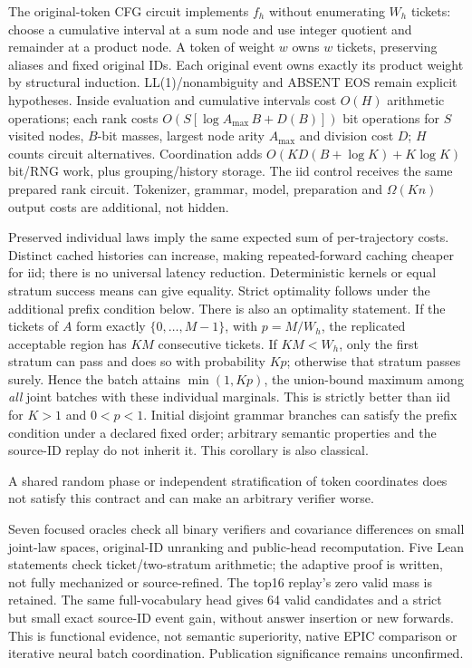\documentclass[12pt]{article}
\theoremstyle{readable}
\begin{document}
The original-token CFG circuit implements $f_h$ without enumerating $W_h$
tickets: choose a cumulative interval at a sum node and use integer quotient
and remainder at a product node. A token of weight $w$ owns $w$ tickets,
preserving aliases and fixed original IDs. Each original event owns exactly
its product weight by structural induction. LL(1)/nonambiguity and ABSENT EOS
remain explicit hypotheses. Inside evaluation and cumulative intervals cost
$O(H)$ arithmetic operations; each rank costs
$O(S[\log A_{\max}\,B+D(B)])$ bit operations for $S$ visited nodes,
$B$-bit masses, largest node arity $A_{\max}$ and division cost $D$;
$H$ counts circuit alternatives. Coordination adds
$O(KD(B+\log K)+K\log K)$ bit/RNG work, plus grouping/history storage.
The iid control receives the same prepared rank circuit. Tokenizer, grammar,
model, preparation and $\Omega(Kn)$ output costs are additional, not hidden.

Preserved individual laws imply the same expected sum of per-trajectory costs.
Distinct cached histories can increase, making repeated-forward caching
cheaper for iid; there is no universal latency reduction. Deterministic kernels
or equal stratum success means can give equality. Strict optimality follows
under the additional prefix condition below.
There is also an optimality statement. If the tickets of $A$ form exactly
$\{0,\ldots,M-1\}$, with $p=M/W_h$, the replicated acceptable region has
$KM$ consecutive tickets. If $KM<W_h$, only the first stratum can pass and
does so with probability $Kp$; otherwise that stratum passes surely. Hence
the batch attains $\min(1,Kp)$, the union-bound maximum among \emph{all}
joint batches with these individual marginals. This is strictly better than
iid for $K>1$ and $0<p<1$. Initial disjoint grammar branches can satisfy the
prefix condition under a declared fixed order; arbitrary semantic properties
and the source-ID replay do not inherit it. This corollary is also classical.

A shared random phase or independent stratification of token coordinates
does not satisfy this contract and can make an arbitrary verifier worse.

Seven focused oracles check all binary verifiers and covariance differences
on small joint-law spaces, original-ID unranking and public-head recomputation.
Five Lean statements check ticket/two-stratum arithmetic; the adaptive proof
is written, not fully mechanized or source-refined. The top16 replay's zero
valid mass is retained. The same full-vocabulary head gives 64 valid candidates
and a strict but small exact source-ID event gain, without answer insertion
or new forwards. This is functional evidence, not semantic superiority,
native EPIC comparison or iterative neural batch coordination.
Publication significance remains unconfirmed.



\end{document}
